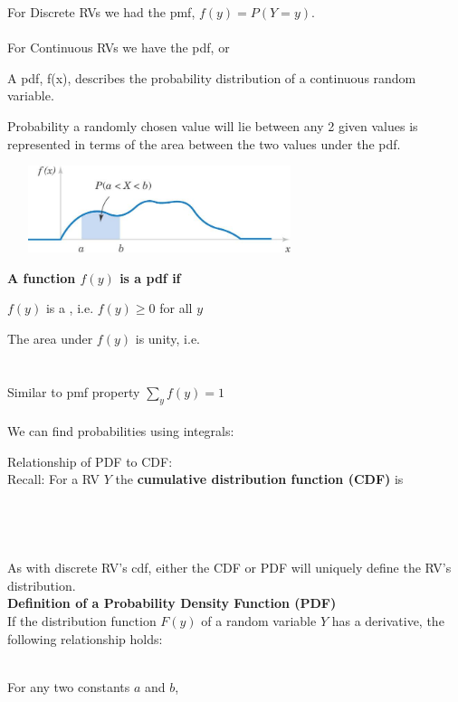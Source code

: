 For Discrete RVs we had the pmf, $f(y)=P(Y=y)$.\\~\\
For Continuous RVs we have the pdf, or \underbar{~~~~~~~~~~~~~~~~~~~~~~~~~~~~~~~~~~~~~~~~}\\
\bi
\item A pdf, f(x), describes the probability distribution of a continuous random variable.  
\item Probability a randomly chosen value will lie between any 2 given values is represented in terms of the area between the two values under the pdf.
\ei
\begin{center}
\includegraphics[width=3.5in, height=1in]{pdf.jpg}\\
\end{center}

\textbf{A function $f(y)$ is a pdf if}
\be
\item $f(y)$ is a \underbar{~~~~~~~~~~~~~~~~~~~~~~~~~~~~~~~~~~~~~~~~~~~~~~~~~~~~~~~}, i.e. $f(y)\geq 0$ for all $y$
\item The area under $f(y)$ is unity, i.e.\\~\\~\\
\ee
Similar to pmf property $\sum_{y}f(y)=1$\\~\\
We can find probabilities using integrals:

\pagebreak

\large Relationship of PDF to CDF:\\\normalsize
Recall: For a RV $Y$ the \textbf{cumulative distribution function (CDF)} is\\~\\~\\~\\~\\
As with discrete RV's cdf, either the CDF or PDF will uniquely define the RV's distribution.\\

\large\textbf{Definition of a Probability Density Function (PDF)}\\\normalsize
If the distribution function $F(y)$ of a random variable $Y$ has a derivative, the following relationship holds:
\begin{center}
\end{center}
\begin{center}
\end{center}
~\\
For any two constants $a$ and $b$,
\begin{center}
\end{center}

